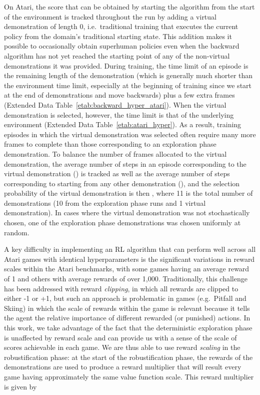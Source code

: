 \documentclass{nature}
\begin{document}
On Atari, the score that can be obtained by starting the algorithm from the start of the environment is tracked throughout the run by adding a virtual demonstration of length 0, i.e.\ traditional training that executes the current policy from the domain's traditional starting state. This addition makes it possible to occasionally obtain superhuman policies even when the backward algorithm has not yet reached the starting point of any of the non-virtual demonstrations it was provided. During training, the time limit of an episode is the remaining length of the demonstration (which is generally much shorter than the environment time limit, especially at the beginning of training since we start at the end of demonstrations and move backwards)        plus a few extra frames (Extended Data Table~\ref{etab:backward_hyper_atari}). When the virtual demonstration is selected, however, the time limit is that of the underlying environment (Extended Data Table~\ref{etab:atari_hyper}). As a result, training episodes in which the virtual demonstration was selected often require many more frames to complete than those corresponding to an exploration phase demonstration.  To balance the number of frames allocated to the virtual demonstration, the average number of steps in an episode corresponding to the virtual demonstration () is tracked as well as the average number of steps corresponding to starting from any other demonstration (), and the selection probability of the virtual demonstration is then , where 11 is the total number of demonstrations (10 from the exploration phase runs and 1 virtual demonstration). In cases where the virtual demonstration was not stochastically chosen, one of the exploration phase demonstrations was chosen uniformly at random.

A key difficulty in implementing an RL algorithm that can perform well across all Atari games with identical hyperparameters is the significant variations in reward scales within the Atari benchmarks, with some games having an average reward of 1 and others with average rewards of over 1,000. 
Traditionally, this challenge has been addressed with reward \emph{clipping}, in which all rewards are clipped to either -1 or +1, but such an approach is problematic in games (e.g.\ Pitfall and Skiing) in which the scale of rewards within the game is relevant because it tells the agent the relative importance of different rewarded (or punished) actions. 
In this work, we take advantage of the fact that the deterministic exploration phase is unaffected by reward scale and can provide us with a sense of the scale of scores achievable in each game. 
We are thus able to use reward \emph{scaling} in the robustification phase: at the start of the robustification phase, the rewards of the demonstrations are used to produce a reward multiplier that will result every game having approximately the same value function scale.
This reward multiplier is given by
\end{document}
